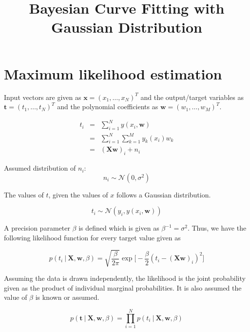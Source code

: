 \documentclass[11pt]{article}
\title{Bayesian Curve Fitting with Gaussian Distribution}
\date{\nonumber}
\newcommand\given[1][]{\:#1\vert\:}
\begin{document}
\maketitle

\section{Maximum likelihood estimation}

Input vectors are given as $\bm{x} = (x_1, \ldots, x_N)^T$ and the output/target variables as $\bm{t} = (t_1, \ldots, t_N)^T$ and the polynomial coefficients as $\bm{w} = (w_1, \ldots, w_M)^T$.

\begin{eqnarray}
        t_{i}
        &=& \sum_{i=1}^N y(x_i, \bm{w})\\
        &=&
        \sum_{i=1}^N \sum_{k=1}^M y_k(x_i)w_k\\
        &=&
        (\bm{X}\bm{w})_i + n_i
\end{eqnarray}

Assumed distribution of $n_i$:
\begin{equation}\label{eqn:model}
n_i \sim \mathcal{N}(0, \sigma^2)
\end{equation}

The values of $t$, given the values of $x$ follows a Gaussian distribution.

\begin{equation}
    t_i \sim \mathcal{N}(y_i, y(x_i, \bm{w}))
\end{equation}

A precision parameter $\beta$ is defined which is given as $\beta^{-1} = \sigma^2$. 
Thus, we have the following likelihood function for every target value given as

\begin{equation}
    p(t_i \given \bm{X}, \bm{w}, \beta) = \sqrt{\frac{\beta}{2\pi}}\exp{\Big[-\frac{\beta}{2} \left(t_i - (\bm{X}\bm{w})_i\right)^2\Big]}
\end{equation}

Assuming the data is drawn independently, the likelihood is the joint probability given as the product of individual marginal probabilities. It is also assumed the value of $\beta$ is known or assumed. 

\begin{equation}\label{eqn:likelihood}
    p(\bm{t} \given \bm{X}, \bm{w}, \beta) = \prod_{i=1}^N p(t_i \given \bm{X}, \bm{w}, \beta)
\end{equation}
\end{document}
